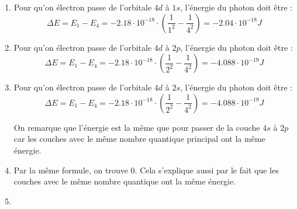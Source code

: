 \documentclass{article}
\begin{document}
\begin{enumerate}
	\item Pour qu'on électron passe de l'orbitale $4d$ à $1s$, l'énergie du photon doit être :
				$$\Delta E = E_1 - E_4 = -2.18 \cdot 10^{-18} \cdot (\frac{1}{1^2} - \frac{1}{4^2}) = -2.04 
				\cdot 10^{-18} J$$
	\item	Pour qu'on électron passe de l'orbitale $4d$ à $2p$, l'énergie du photon doit être :
				$$\Delta E = E_1 - E_4 = -2.18 \cdot 10^{-18} \cdot (\frac{1}{2^2} - \frac{1}{4^2}) = -4.088 
				\cdot 10^{-19} J$$
	\item Pour qu'on électron passe de l'orbitale $4d$ à $2s$, l'énergie du photon doit être :
				$$\Delta E = E_1 - E_4 = -2.18 \cdot 10^{-18} \cdot (\frac{1}{2^2} - \frac{1}{4^2}) = -4.088 
				\cdot 10^{-19} J$$
				
				On remarque que l'énergie est la même que pour passer de la couche $4s$ à $2p$ car les couches
				avec le même nombre quantique principal ont la même énergie.
	\item	Par la même formule, on trouve 0. Cela s'explique aussi par le fait que les couches avec le même 
				nombre quantique ont la même énergie.
	\item %
\end{enumerate}
\end{document}

